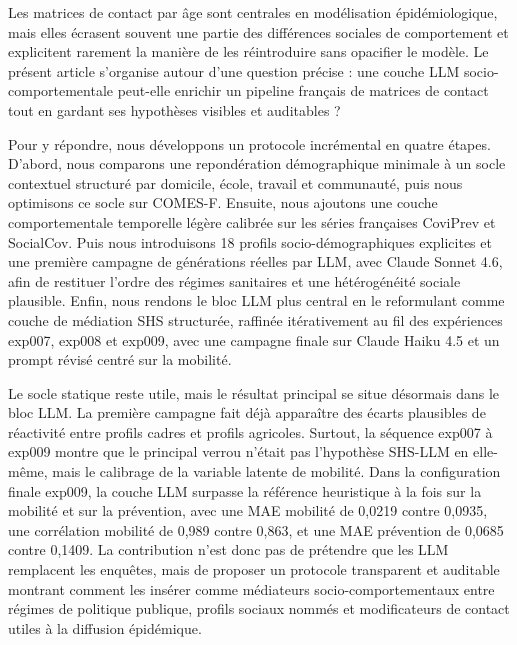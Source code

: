 \documentclass[ROIA,Unicode]{cedram}
\begin{document}
\begin{altabstract}
Les matrices de contact par âge sont centrales en modélisation épidémiologique, mais elles écrasent souvent une partie des différences sociales de comportement et explicitent rarement la manière de les réintroduire sans opacifier le modèle. Le présent article s'organise autour d'une question précise : une couche LLM socio-comportementale peut-elle enrichir un pipeline français de matrices de contact tout en gardant ses hypothèses visibles et auditables ?

Pour y répondre, nous développons un protocole incrémental en quatre étapes. D'abord, nous comparons une repondération démographique minimale à un socle contextuel structuré par domicile, école, travail et communauté, puis nous optimisons ce socle sur COMES-F. Ensuite, nous ajoutons une couche comportementale temporelle légère calibrée sur les séries françaises CoviPrev et SocialCov. Puis nous introduisons 18 profils socio-démographiques explicites et une première campagne de générations réelles par LLM, avec Claude Sonnet 4.6, afin de restituer l'ordre des régimes sanitaires et une hétérogénéité sociale plausible. Enfin, nous rendons le bloc LLM plus central en le reformulant comme couche de médiation SHS structurée, raffinée itérativement au fil des expériences exp007, exp008 et exp009, avec une campagne finale sur Claude Haiku 4.5 et un prompt révisé centré sur la mobilité.

Le socle statique reste utile, mais le résultat principal se situe désormais dans le bloc LLM. La première campagne fait déjà apparaître des écarts plausibles de réactivité entre profils cadres et profils agricoles. Surtout, la séquence exp007 à exp009 montre que le principal verrou n'était pas l'hypothèse SHS-LLM en elle-même, mais le calibrage de la variable latente de mobilité. Dans la configuration finale exp009, la couche LLM surpasse la référence heuristique à la fois sur la mobilité et sur la prévention, avec une MAE mobilité de 0,0219 contre 0,0935, une corrélation mobilité de 0,989 contre 0,863, et une MAE prévention de 0,0685 contre 0,1409. La contribution n'est donc pas de prétendre que les LLM remplacent les enquêtes, mais de proposer un protocole transparent et auditable montrant comment les insérer comme médiateurs socio-comportementaux entre régimes de politique publique, profils sociaux nommés et modificateurs de contact utiles à la diffusion épidémique.
\end{altabstract}

\maketitle
\end{document}
